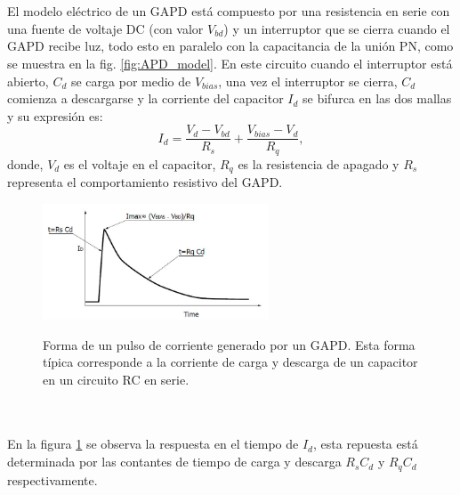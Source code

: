 \\ \\
El modelo eléctrico  de un GAPD está compuesto por una resistencia en serie con una fuente de voltaje DC (con valor $V_{bd}$) y un interruptor que se cierra cuando el GAPD recibe luz, todo esto en paralelo con la capacitancia de la unión PN, como se muestra en la fig. \ref{fig:APD_model}. En este circuito cuando el interruptor está abierto, $C_d$ se carga por medio de $V_{bias}$, una vez el interruptor se cierra, $C_d$ comienza a descargarse y la corriente del capacitor $I_d$ se bifurca en las dos mallas y su expresión es:
\begin{equation}
    I_d=\frac{V_d-V_{bd}}{R_s}+\frac{V_{bias}-V_d}{R_q},
\end{equation}
donde, $V_d$ es el voltaje en el capacitor, $R_q$ es la resistencia de apagado y $R_s$ representa el comportamiento resistivo del GAPD.
\begin{figure}[h!]
\begin{centering}
    \caption{Forma de un pulso de corriente generado por un GAPD. Esta forma típica corresponde a la corriente de carga y descarga de un capacitor en un circuito RC en serie.}
    \includegraphics[width=0.6\textwidth]{Images/GAPD_response.JPG}
    \label{fig:APD_response}  
  \par\end{centering}
\end{figure}
\\ \\
En la figura \ref{fig:APD_response} se observa la respuesta en el tiempo de $I_d$, esta repuesta está determinada por las contantes de tiempo de carga y descarga  $R_s C_d$ y $R_q C_d$ respectivamente.\\    
